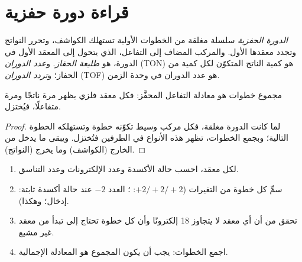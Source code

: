 \section{قراءة دورة حفزية}

\begin{definition}\label{def:b2:catalytic-cycles:cycle}
\emph{الدورة الحفزية} سلسلة مغلقة من الخطوات الأولية
تستهلك الكواشف، وتحرر النواتج وتجدد معقدها الأول. 
والمركب المضاف إلى التفاعل، الذي يتحول إلى المعقد الأول في الدورة، هو
\emph{طليعة الحفاز}. و\emph{عدد الدوران}
(TON) هو كمية الناتج المتكوّن لكل كمية من الحفاز؛ و\emph{تردد
الدوران} (TOF) هو عدد الدوران في وحدة الزمن.
\end{definition}

\begin{proposition}\label{prop:b2:catalytic-cycles:cycle-sum}
مجموع خطوات  هو معادلة التفاعل المحفَّز:
فكل معقد فلزي يظهر مرة ناتجًا ومرة متفاعلًا، فيُختزل.
\end{proposition}

\begin{proof}
لما كانت الدورة مغلقة، فكل مركب وسيط تكوّنه خطوة وتستهلكه الخطوة التالية؛
وبجمع الخطوات، تظهر هذه الأنواع في الطرفين فتُختزل. ويبقى
ما يدخل من الخارج (الكواشف) وما يخرج (النواتج).
\end{proof}

\begin{method}\label{met:b2:catalytic-cycles:read-cycle}
\begin{enumerate}
  \item لكل معقد، احسب حالة الأكسدة وعدد الإلكترونات 
        وعدد التناسق.
  \item سمِّ كل خطوة من التغيرات ($+2/+2/+2$: ؛ العدد $-2$ عند
        حالة أكسدة ثابتة: إدخال؛ وهكذا).
  \item تحقق من أن أي معقد لا يتجاوز 18 إلكترونًا وأن كل خطوة تحتاج إلى 
        تبدأ من معقد غير مشبع.
  \item اجمع الخطوات: يجب أن يكون المجموع هو المعادلة الإجمالية.
\end{enumerate}
\end{method}

